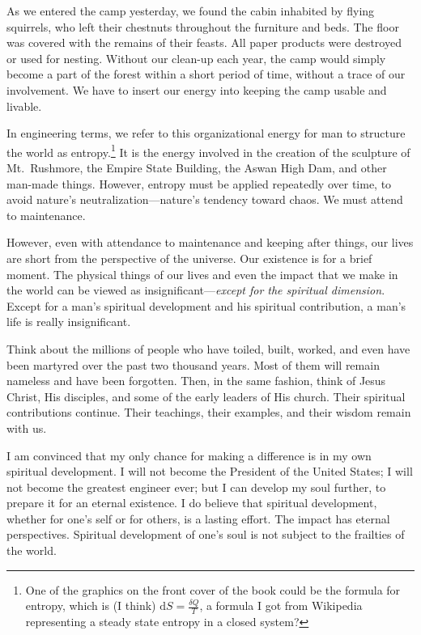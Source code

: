 \documentclass[12pt]{memoir}
\begin{document}
As we entered the camp yesterday, we found the cabin inhabited by flying squirrels, who left their chestnuts throughout the furniture and beds. The floor was covered with the remains of their feasts.
All paper products were destroyed or used for nesting. Without our
clean-up each year, the camp would simply become a part of the forest
within a short period of time, without a trace of our involvement.
We have to insert our energy into keeping the camp usable and livable.

In engineering terms, we refer to this organizational energy for man
to structure the world as entropy.\footnote{One of the graphics on the front cover of the book could be the formula for entropy, which is (I think) $\textrm{d}S = \frac{\delta Q}T$, a formula I got from Wikipedia representing a steady state entropy in a closed system?} It is the energy involved in the
creation of the sculpture of Mt.\ Rushmore, the Empire State Building,
the Aswan High Dam, and other man-made things. However, entropy must
be applied repeatedly over time, to avoid nature's neutralization---nature's tendency toward chaos.
We must attend to maintenance. 

However, even with attendance to maintenance and keeping after things, our lives are short from the perspective of the universe.
Our existence is for a brief moment. The physical things of our lives
and even the impact that we make in the world can be viewed as insignificant---\emph{except
for the spiritual dimension}. Except for a man's spiritual development
and his spiritual contribution, a man's life is really insignificant.

Think about the millions of people who have toiled, built, worked, and even have been martyred over the past two thousand years.
Most of them will remain nameless and have been forgotten. Then, in the
same fashion, think of Jesus Christ, His disciples, and some of the
early leaders of His church. Their spiritual contributions continue.
Their teachings, their examples, and their wisdom remain with us. 

I am convinced that my only chance for making a difference is in my
own spiritual development. I will not become the President of the
United States; I will not become the greatest engineer ever;
but I can develop my soul further, to prepare it for an eternal existence.
I do believe that spiritual development, whether for one's self or for
others, is a lasting effort. The impact has eternal perspectives.
Spiritual development of one's soul is not subject to the frailties
of the world.
\end{document}
